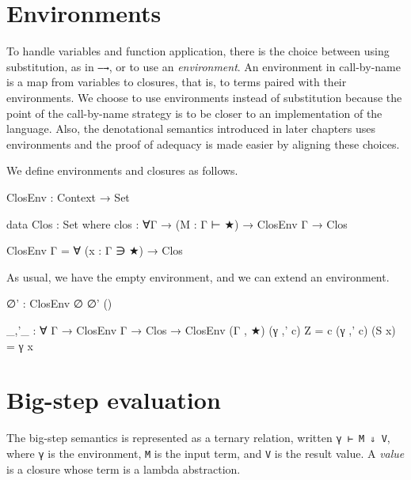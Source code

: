 \hypertarget{environments}{%
\section{Environments}\label{environments}}

To handle variables and function application, there is the choice
between using substitution, as in \texttt{—→}, or to use an
\emph{environment}. An environment in call-by-name is a map from
variables to closures, that is, to terms paired with their environments.
We choose to use environments instead of substitution because the point
of the call-by-name strategy is to be closer to an implementation of the
language. Also, the denotational semantics introduced in later chapters
uses environments and the proof of adequacy is made easier by aligning
these choices.

We define environments and closures as follows.

\begin{fence}
\begin{code}
ClosEnv : Context → Set

data Clos : Set where
  clos : ∀{Γ} → (M : Γ ⊢ ★) → ClosEnv Γ → Clos

ClosEnv Γ = ∀ (x : Γ ∋ ★) → Clos
\end{code}
\end{fence}

As usual, we have the empty environment, and we can extend an
environment.

\begin{fence}
\begin{code}
∅' : ClosEnv ∅
∅' ()

_,'_ : ∀ {Γ} → ClosEnv Γ → Clos → ClosEnv (Γ , ★)
(γ ,' c) Z = c
(γ ,' c) (S x) = γ x
\end{code}
\end{fence}

\hypertarget{big-step-evaluation}{%
\section{Big-step evaluation}\label{big-step-evaluation}}

The big-step semantics is represented as a ternary relation, written
\texttt{γ\ ⊢\ M\ ⇓\ V}, where \texttt{γ} is the environment, \texttt{M}
is the input term, and \texttt{V} is the result value. A \emph{value} is
a closure whose term is a lambda abstraction.

